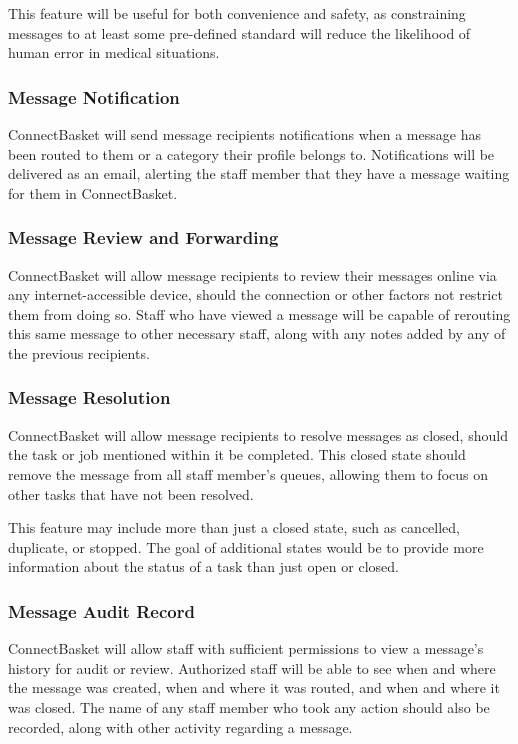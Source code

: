 \documentclass[onecolumn, draftclsnofoot,10pt, compsoc]{IEEEtran}
\begin{document}
This feature will be useful for both convenience and safety, as constraining messages to at least some pre-defined standard will reduce the likelihood of human error in medical situations.

\subsubsection{Message Notification}
ConnectBasket will send message recipients notifications when a message has been routed to them or a category their profile belongs to. Notifications will be delivered as an email, alerting the staff member that they have a message waiting for them in ConnectBasket.

\subsubsection{Message Review and Forwarding}
ConnectBasket will allow message recipients to review their messages online via any internet-accessible device, should the connection or other factors not restrict them from doing so. Staff who have viewed a message will be capable of rerouting this same message to other necessary staff, along with any notes added by any of the previous recipients. 

\subsubsection{Message Resolution}
ConnectBasket will allow message recipients to resolve messages as closed, should the task or job mentioned within it be completed. This closed state should remove the message from all staff member's queues, allowing them to focus on other tasks that have not been resolved.
	
This feature may include more than just a closed state, such as cancelled, duplicate, or stopped. The goal of additional states would be to provide more information about the status of a task than just open or closed.

\subsubsection{Message Audit Record}
ConnectBasket will allow staff with sufficient permissions to view a message's  history for audit or review. Authorized staff will  be able to see when and where the message was created, when and where it was routed, and when and where it was closed. The name of any staff member who took any action should also be recorded, along with other activity regarding a message. 
\end{document}
